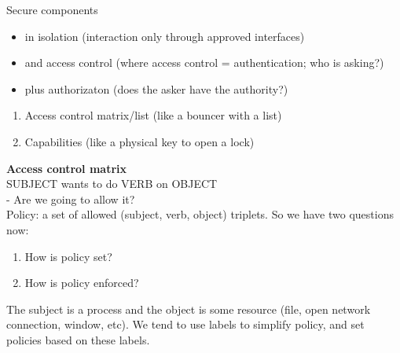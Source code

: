 

Secure components
\begin{itemize}
    \item in isolation (interaction only through approved interfaces)
    \item and access control (where access control = authentication; who is asking?)
    \item plus authorizaton (does the asker have the authority?)
\end{itemize}

\begin{enumerate}
    \item Access control matrix/list (like a bouncer with a list)
    \item Capabilities (like a physical key to open a lock)
\end{enumerate}

\textbf{Access control matrix}\\
SUBJECT wants to do VERB on OBJECT\\
- Are we going to allow it?\\

Policy: a set of allowed (subject, verb, object) triplets. So we have two questions now:
\begin{enumerate}
    \item How is policy set?
    \item How is policy enforced?\\
\end{enumerate}

The subject is a process and the object is some resource (file, open network connection, window, etc). We tend to use labels to simplify policy, and set policies based on these labels.

